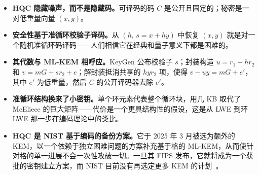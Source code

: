 \begin{itemize}
  \item \textbf{HQC 隐藏噪声，而不是隐藏码。}可译码的码 $C$ 是公开且固定的；秘密是一对低重量向量 $(x,y)$。
  \item \textbf{安全性基于准循环校验子译码。}从 $(h,\,s=x+hy)$ 中恢复 $(x,y)$ 就是对一个随机准循环码译码——人们相信它在经典和量子意义下都是困难的。
  \item \textbf{其代数与 ML-KEM 相呼应。}KeyGen 公布校验子 $s$；封装构造 $u = r_1 + h r_2$ 和 $v = mG + s r_2 + e$；解封装抵消共享的 $h y r_2$ 项，使得 $v - u y = mG + e'$，其中 $e'$ 为低重量，然后 $C$ 的公开译码器去除 $e'$。
  \item \textbf{准循环结构换来了小密钥。}单个环元素代表整个循环块，用几 KB 取代了 McEliece 的巨大矩阵——代价是一个更具结构性的假设，这是从 LWE 到环 LWE 那一步在编码理论中的类比。
  \item \textbf{HQC 是 NIST 基于编码的备份方案。}它于 2025 年 3 月被选为额外的 KEM，以一个依赖于独立困难问题的方案补充基于格的 ML-KEM，从而使针对格的单一进展不会一次性攻破一切。一旦其 FIPS 发布，它就将成为一个获批的密钥建立方案，而 NIST 目前没有再选定更多 KEM 的计划~\cite{nistir8547}。
\end{itemize}

\printbibliography[heading=chapterrefs]
